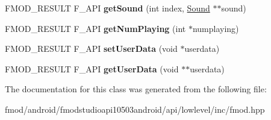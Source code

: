 \begin{DoxyCompactItemize}
\item 
\hypertarget{class_f_m_o_d_1_1_sound_group_a81b9002220c4b6b03d7252d7a1b20f20}{F\+M\+O\+D\+\_\+\+R\+E\+S\+U\+L\+T F\+\_\+\+A\+P\+I {\bfseries get\+Sound} (int index, \hyperlink{class_f_m_o_d_1_1_sound}{Sound} $\ast$$\ast$sound)}\label{class_f_m_o_d_1_1_sound_group_a81b9002220c4b6b03d7252d7a1b20f20}

\item 
\hypertarget{class_f_m_o_d_1_1_sound_group_af88057e101e4dd2268d1a6f6656db75b}{F\+M\+O\+D\+\_\+\+R\+E\+S\+U\+L\+T F\+\_\+\+A\+P\+I {\bfseries get\+Num\+Playing} (int $\ast$numplaying)}\label{class_f_m_o_d_1_1_sound_group_af88057e101e4dd2268d1a6f6656db75b}

\item 
\hypertarget{class_f_m_o_d_1_1_sound_group_a3315678b522baf2d74f732ab671f48c7}{F\+M\+O\+D\+\_\+\+R\+E\+S\+U\+L\+T F\+\_\+\+A\+P\+I {\bfseries set\+User\+Data} (void $\ast$userdata)}\label{class_f_m_o_d_1_1_sound_group_a3315678b522baf2d74f732ab671f48c7}

\item 
\hypertarget{class_f_m_o_d_1_1_sound_group_ac428e826a819030cbab7ffa666d7d9cd}{F\+M\+O\+D\+\_\+\+R\+E\+S\+U\+L\+T F\+\_\+\+A\+P\+I {\bfseries get\+User\+Data} (void $\ast$$\ast$userdata)}\label{class_f_m_o_d_1_1_sound_group_ac428e826a819030cbab7ffa666d7d9cd}

\end{DoxyCompactItemize}


The documentation for this class was generated from the following file\+:\begin{DoxyCompactItemize}
\item 
fmod/android/fmodstudioapi10503android/api/lowlevel/inc/fmod.\+hpp\end{DoxyCompactItemize}
